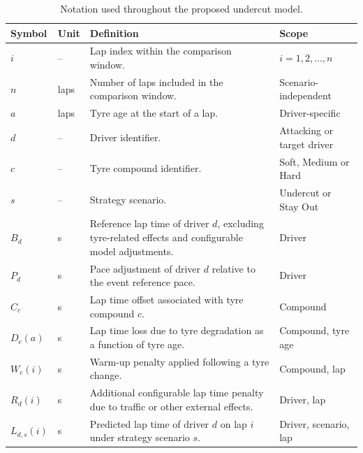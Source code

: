 \begin{table}[htbp]
\centering
\caption{Notation used throughout the proposed undercut model.}
\label{tab:model_notation}

\begin{tabular}{|l|l|p{7.5cm}|l|}
\hline
\textbf{Symbol} & \textbf{Unit} & \textbf{Definition} & \textbf{Scope} \\
\hline

$i$ & -- &
Lap index within the comparison window. &
$i = 1,2,\ldots,n$ \\
\hline

$n$ & laps &
Number of laps included in the comparison window. &
Scenario-independent \\
\hline

$a$ & laps &
Tyre age at the start of a lap. &
Driver-specific \\
\hline

$d$ & -- &
Driver identifier. &
Attacking or target driver \\
\hline

$c$ & -- &
Tyre compound identifier. &
Soft, Medium or Hard \\
\hline

$s$ & -- &
Strategy scenario. &
Undercut or Stay Out \\
\hline

$B_d$ & s &
Reference lap time of driver $d$, excluding tyre-related effects and configurable model adjustments. &
Driver \\
\hline

$P_d$ & s &
Pace adjustment of driver $d$ relative to the event reference pace. &
Driver \\
\hline

$C_c$ & s &
Lap time offset associated with tyre compound $c$. &
Compound \\
\hline

$D_c(a)$ & s &
Lap time loss due to tyre degradation as a function of tyre age. &
Compound, tyre age \\
\hline

$W_c(i)$ & s &
Warm-up penalty applied following a tyre change. &
Compound, lap \\
\hline

$R_d(i)$ & s &
Additional configurable lap time penalty due to traffic or other external effects. &
Driver, lap \\
\hline

$L_{d,s}(i)$ & s &
Predicted lap time of driver $d$ on lap $i$ under strategy scenario $s$. &
Driver, scenario, lap \\
\hline


\end{tabular}
\end{table}

